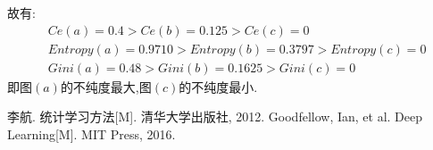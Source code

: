 \label{key}\documentclass[UTF8,a4paper,11pt]{ctexart}
\begin{document}
故有:
\begin{equation*}
	\begin{split}
		&Ce(a)=0.4>Ce(b)=0.125>Ce(c)=0\\
		&Entropy(a)=0.9710>Entropy(b)=0.3797>Entropy(c)=0\\
		&Gini(a)=0.48>Gini(b)=0.1625>Gini(c)=0
	\end{split}
\end{equation*}
即图$(a)$的不纯度最大,图$(c)$的不纯度最小.
\newpage
\begin{thebibliography}{3}  
	 李航. 统计学习方法[M]. 清华大学出版社, 2012.
	 Goodfellow, Ian, et al. Deep Learning[M]. MIT Press, 2016. 	
\end{thebibliography}
\end{document}
